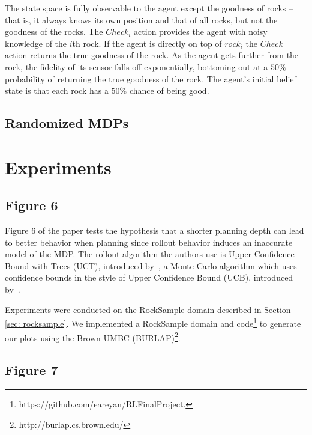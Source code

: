 \documentclass[11pt,twocolumn]{article}
\begin{document}
The state space is fully observable to the agent except the goodness of rocks -- that is, it always knows its own position and that of all rocks, but not the goodness of the rocks. The $Check_i$ action provides the agent with noisy knowledge of the $i$th rock. If the agent is directly on top of $rock_i$ the $Check$ action returns the true goodness of the rock. As the agent gets further from the rock, the fidelity of its sensor falls off exponentially, bottoming out at a $50\%$ probability of returning the true goodness of the rock. The agent's initial belief state is that each rock has a $50\%$ chance of being good.


\subsection{Randomized MDPs}


\section{Experiments}
\subsection{Figure 6}
Figure 6 of the paper tests the hypothesis that a shorter planning depth can lead to better behavior when planning since rollout behavior induces an inaccurate model of the MDP. The rollout algorithm the authors use is Upper Confidence Bound with Trees (UCT), introduced by~\cite{kocsis2006bandit}, a Monte Carlo algorithm which uses confidence bounds in the style of Upper Confidence Bound (UCB), introduced by~\cite{auer2002finite}.

Experiments were conducted on the RockSample domain described in Section \ref{sec: rocksample}. We implemented a RockSample domain and code\footnote{https://github.com/eareyan/RLFinalProject.} to generate our plots using the Brown-UMBC (BURLAP)\footnote{http://burlap.cs.brown.edu/}.

\subsection{Figure 7}
\end{document}
